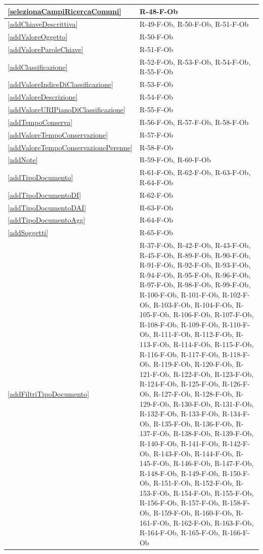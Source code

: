 \begin{longtable}{|p{4cm}|p{10cm}|}
\hline
\ref{selezionaCampiRicercaComuni} & R-48-F-Ob \\
\hline
\ref{addChiaveDescrittiva} & R-49-F-Ob, R-50-F-Ob, R-51-F-Ob \\
\hline
\ref{addValoreOggetto} & R-50-F-Ob \\
\hline
\ref{addValoreParoleChiave} & R-51-F-Ob \\
\hline
\ref{addClassificazione} & R-52-F-Ob, R-53-F-Ob, R-54-F-Ob, R-55-F-Ob \\
\hline
\ref{addValoreIndiceDiClassificazione} & R-53-F-Ob \\
\hline
\ref{addValoreDescrizione} & R-54-F-Ob \\
\hline
\ref{addValoreURIPianoDiClassificazione} & R-55-F-Ob \\
\hline
\ref{addTempoConserva} & R-56-F-Ob, R-57-F-Ob, R-58-F-Ob \\
\hline
\ref{addValoreTempoConservazione} & R-57-F-Ob \\
\hline
\ref{addValoreTempoConservazionePerenne} & R-58-F-Ob \\
\hline
\ref{addNote} & R-59-F-Ob, R-60-F-Ob \\
\hline
\ref{addTipoDocumento} & R-61-F-Ob, R-62-F-Ob, R-63-F-Ob, R-64-F-Ob \\
\hline
\ref{addTipoDocumentoDI} & R-62-F-Ob \\
\hline
\ref{addTipoDocumentoDAI} & R-63-F-Ob \\
\hline
\ref{addTipoDocumentoAgg} & R-64-F-Ob \\
\hline
\ref{addSoggetti} & R-65-F-Ob \\
\hline
\ref{addFiltriTipoDocumento} & R-37-F-Ob, R-42-F-Ob, R-43-F-Ob, R-45-F-Ob, R-89-F-Ob, R-90-F-Ob, R-91-F-Ob, R-92-F-Ob, R-93-F-Ob, R-94-F-Ob, R-95-F-Ob, R-96-F-Ob, R-97-F-Ob, R-98-F-Ob, R-99-F-Ob, R-100-F-Ob, R-101-F-Ob, R-102-F-Ob, R-103-F-Ob, R-104-F-Ob, R-105-F-Ob, R-106-F-Ob, R-107-F-Ob, R-108-F-Ob, R-109-F-Ob, R-110-F-Ob, R-111-F-Ob, R-112-F-Ob, R-113-F-Ob, R-114-F-Ob, R-115-F-Ob, R-116-F-Ob, R-117-F-Ob, R-118-F-Ob, R-119-F-Ob, R-120-F-Ob, R-121-F-Ob, R-122-F-Ob, R-123-F-Ob, R-124-F-Ob, R-125-F-Ob, R-126-F-Ob, R-127-F-Ob, R-128-F-Ob, R-129-F-Ob, R-130-F-Ob, R-131-F-Ob, R-132-F-Ob, R-133-F-Ob, R-134-F-Ob, R-135-F-Ob, R-136-F-Ob, R-137-F-Ob, R-138-F-Ob, R-139-F-Ob, R-140-F-Ob, R-141-F-Ob, R-142-F-Ob, R-143-F-Ob, R-144-F-Ob, R-145-F-Ob, R-146-F-Ob, R-147-F-Ob, R-148-F-Ob, R-149-F-Ob, R-150-F-Ob, R-151-F-Ob, R-152-F-Ob, R-153-F-Ob, R-154-F-Ob, R-155-F-Ob, R-156-F-Ob, R-157-F-Ob, R-158-F-Ob, R-159-F-Ob, R-160-F-Ob, R-161-F-Ob, R-162-F-Ob, R-163-F-Ob, R-164-F-Ob, R-165-F-Ob, R-166-F-Ob \\

\end{longtable}
